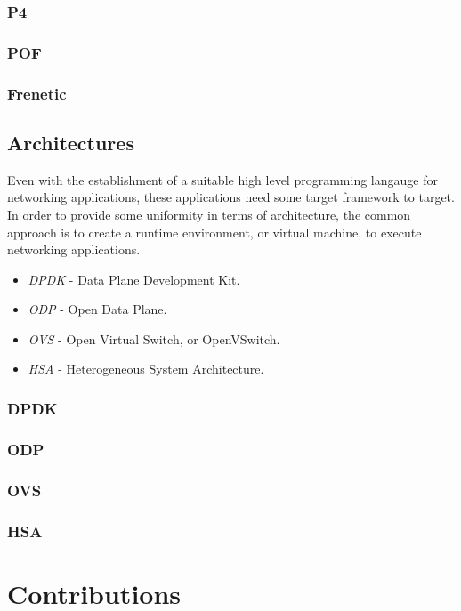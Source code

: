 \subsubsection{P4}

\subsubsection{POF}

\subsubsection{Frenetic}


\subsection{Architectures}
Even with the establishment of a suitable high level programming langauge for
networking applications, these applications need some target framework to 
target. In order to provide some uniformity in terms of architecture, the 
common approach is to create a runtime environment, or virtual machine, to 
execute networking applications. 
\begin{itemize}
\item \emph{DPDK} - Data Plane Development Kit.
\item \emph{ODP} - Open Data Plane.
\item \emph{OVS} - Open Virtual Switch, or OpenVSwitch.
\item \emph{HSA} - Heterogeneous System Architecture.
\end{itemize}

\subsubsection{DPDK}

\subsubsection{ODP}

\subsubsection{OVS}

\subsubsection{HSA}

\section{Contributions}

